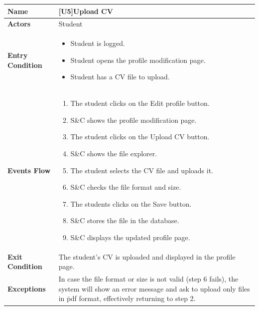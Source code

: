 \begin{center}
    \begin{tabular}{|p{9em}|p{27em}|}
        \hline
        \rowcolor{bluepoli!40} %
        \textbf{Name} & \textbf{[U5]Upload CV} \\
        \hline
        \textbf{Actors} & Student \\
        \hline
        \textbf{Entry Condition} & 
        \begin{itemize}
            \item Student is logged.
            \item Student opens the profile modification page.
            \item Student has a CV file to upload.
        \end{itemize} \\
        \hline
        \textbf{Events Flow} & 
        \begin{enumerate}
            \item The student clicks on the Edit profile button.
            \item S\&C shows the profile modification page.
            \item The student clicks on the Upload CV button.
            \item S\&C shows the file explorer.
            \item The student selects the CV file and uploads it.
            \item S\&C checks the file format and size.
            \item The students clicks on the Save button.
            \item S\&C stores the file in the database.
            \item S\&C displays the updated profile page.
        \end{enumerate} \\
        \hline
        \textbf{Exit Condition} & The student's CV is uploaded and displayed in the profile page. \\
        \hline
        \textbf{Exceptions} & In case the file format or size is not valid (step 6 fails), the system will show an error message and ask 
        to upload only files in \.pdf format, effectively returning to step 2. \\
        \hline
    \end{tabular}
\end{center}

